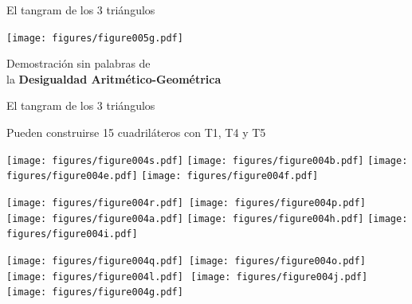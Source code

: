 \documentclass[14pt,aspectratio=169,usenames,dvipsnames]{beamer}
\begin{document}

    \begin{frame}{El tangram de los 3 triángulos}
        \begin{center}
            \texttt{[image: figures/figure005g.pdf]}

            \bigskip
            Demostración sin palabras de\\la \textbf{Desigualdad Aritmético-Geométrica}
            \bigskip
        \end{center}
    \end{frame}


    \begin{frame}{El tangram de los 3 triángulos}
        \begin{center}
            Pueden construirse 15 cuadriláteros con T1, T4 y T5

            \bigskip \bigskip

            \texttt{[image: figures/figure004s.pdf]}\quad
            \quad
            \texttt{[image: figures/figure004b.pdf]}\quad
            \texttt{[image: figures/figure004e.pdf]}\quad
            \texttt{[image: figures/figure004f.pdf]}\\

            \bigskip \bigskip

            \texttt{[image: figures/figure004r.pdf]}\quad\,
            \texttt{[image: figures/figure004p.pdf]}\quad
            \texttt{[image: figures/figure004a.pdf]}\quad
            \texttt{[image: figures/figure004h.pdf]}\quad
            \texttt{[image: figures/figure004i.pdf]}\!\\

            \bigskip \bigskip

            \texttt{[image: figures/figure004q.pdf]}\quad\;\,
            \texttt{[image: figures/figure004o.pdf]}\quad
            \texttt{[image: figures/figure004l.pdf]}\quad\,\,
            \texttt{[image: figures/figure004j.pdf]}\quad\;\,
            \texttt{[image: figures/figure004g.pdf]}\phantom{.}\\

            \bigskip \bigskip
        \end{center}
    \end{frame}
\end{document}
